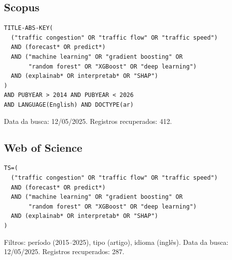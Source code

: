 \label{ap:ap_string}

\subsection*{Scopus}

\begin{quadros}[!ht]
  \caption{Expressão de busca aplicada na base Scopus}
  \label{qua:string_scopus}
\begin{lstlisting}[style=busca]
TITLE-ABS-KEY(
  ("traffic congestion" OR "traffic flow" OR "traffic speed")
  AND (forecast* OR predict*)
  AND ("machine learning" OR "gradient boosting" OR
       "random forest" OR "XGBoost" OR "deep learning")
  AND (explainab* OR interpretab* OR "SHAP")
)
AND PUBYEAR > 2014 AND PUBYEAR < 2026
AND LANGUAGE(English) AND DOCTYPE(ar)
\end{lstlisting}
  {\footnotesize\singlespacing Data da busca: 12/05/2025. Registros recuperados: 412.\par}
\end{quadros}

\subsection*{Web of Science}

\begin{quadros}[!ht]
  \caption{Expressão de busca aplicada na base Web of Science}
  \label{qua:string_wos}
\begin{lstlisting}[style=busca]
TS=(
  ("traffic congestion" OR "traffic flow" OR "traffic speed")
  AND (forecast* OR predict*)
  AND ("machine learning" OR "gradient boosting" OR
       "random forest" OR "XGBoost" OR "deep learning")
  AND (explainab* OR interpretab* OR "SHAP")
)
\end{lstlisting}
  {\footnotesize\singlespacing Filtros: período (2015--2025), tipo (artigo), idioma (inglês). Data da busca: 12/05/2025. Registros recuperados: 287.\par}
\end{quadros}

